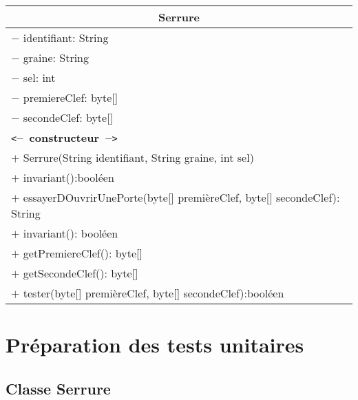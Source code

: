 \documentclass[11pt,article]{article}
\newcommand{\cmt}[1]{\texttt{<}\textbf{--~#1~--}\texttt{>}}
\begin{document}
\begin{center}
\begin{longtable}{|p{15cm}|} 
\hline
\multicolumn{1}{|c|}{{\Large \textsf{Serrure}}} \\
\hline
$-$ identifiant: String \\
$-$ graine: String \\
$-$ sel: int \\
$-$ premiereClef: byte[] \\
$-$ secondeClef: byte[] \\
\hline
\cmt{constructeur} \\
$+$ Serrure(String identifiant, String graine, int sel)\\
$+$ invariant():booléen\\
$+$ essayerDOuvrirUnePorte(byte[] premièreClef, byte[] secondeClef): String \\
$+$ invariant(): booléen \\
$+$ getPremiereClef(): byte[] \\
$+$ getSecondeClef(): byte[] \\
$+$ tester(byte[] premièreClef, byte[] secondeClef):booléen \\
\hline  
\end{longtable}%
\end{center}

\newpage

\section{Préparation des tests unitaires}

\subsection{Classe \textsf{Serrure}}
\end{document}
